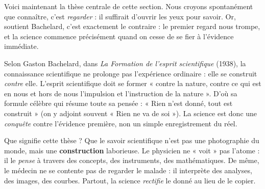 \documentclass[11pt]{article}
\begin{document}
Voici maintenant la thèse centrale de cette section. Nous croyons spontanément que connaître, c'est \emph{regarder} : il suffirait d'ouvrir les yeux pour savoir. Or, soutient Bachelard, c'est exactement le contraire : le premier regard nous trompe, et la science commence précisément quand on cesse de se fier à l'évidence immédiate.

\begin{propriete}
Selon Gaston Bachelard, dans \emph{La Formation de l'esprit scientifique} (1938), la connaissance scientifique ne prolonge pas l'expérience ordinaire : elle se construit \emph{contre} elle. L'esprit scientifique doit se former « contre la nature, contre ce qui est en nous et hors de nous l'impulsion et l'instruction de la nature ». D'où sa formule célèbre qui résume toute sa pensée : « Rien n'est donné, tout est construit » (on y adjoint souvent « Rien ne va de soi »). La science est donc une \emph{conquête} contre l'évidence première, non un simple enregistrement du réel.
\end{propriete}

Que signifie cette thèse ? Que le savoir scientifique n'est pas une photographie du monde, mais une \textbf{construction} laborieuse. Le physicien ne « voit » pas l'atome : il le \emph{pense} à travers des concepts, des instruments, des mathématiques. De même, le médecin ne se contente pas de regarder le malade : il interprète des analyses, des images, des courbes. Partout, la science \emph{rectifie} le donné au lieu de le copier.
\end{document}
